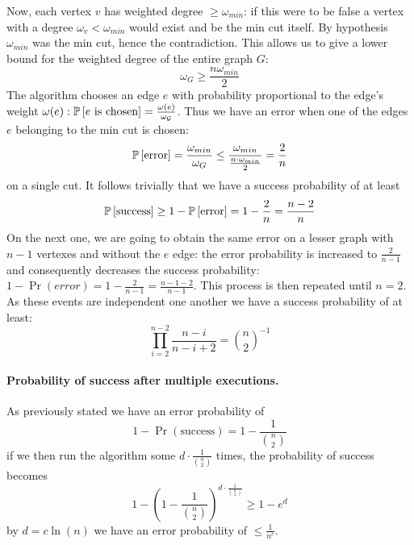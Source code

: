 Now, each vertex $v$ has weighted degree $\geq \omega_{min}$: if this were to be false a vertex with a degree $\omega_v < \omega_{min}$ would exist and be the min cut itself.
By hypothesis $\omega_{min}$ was the min cut, hence the contradiction.
This allows us to give a lower bound for the weighted degree of the entire graph $G$:
\begin{equation*}
\omega_G \geq \frac{n\omega_{min}}{2}
\end{equation*}
The algorithm chooses an edge $e$ with probability proportional to the edge's weight $\omega(e): \operatorname*{\mathbb{P}}\left[{e \text{ is chosen}}\right] = \frac{\omega(e)}{\mathcal{\omega_G}}$.
Thus we have an error when one of the edges $e$ belonging to the min cut is chosen:
\begin{equation*}
\operatorname*{\mathbb{P}}\left[{\text{error}}\right] = \frac{\omega_{min}}{\omega_G} \leq \frac{\omega_{min}}{\frac{n \cdot \omega_{min}}{2}} = \frac{2}{n}
\end{equation*}
on a single cut.
It follows trivially that we have a success probability of at least
\begin{equation*}
\operatorname*{\mathbb{P}}\left[{\text{success}}\right] \geq 1 - \operatorname*{\mathbb{P}}\left[{\text{error}}\right] = 1 - \frac{2}{n} = \frac{n - 2}{n}
\end{equation*}
On the next one, we are going to obtain the same error on a lesser graph with $n - 1$ vertexes and without the $e$ edge: the error probability is increased to $\frac{2}{n - 1}$ and consequently decreases the success probability: $1 - \Pr(error) = 1 - \frac{2}{n - 1} = \frac{n - 1 - 2}{n - 1}$.
This process is then repeated until $n = 2$.
As these events are independent one another we have a success probability of at least:
\begin{equation*}
\prod_{i = 2}^{n - 2} \frac{n - i}{n - i + 2} = {{n}\choose{2}}^{-1}
\end{equation*}

\paragraph{Probability of success after multiple executions.}
As previously stated we have an error probability of
\begin{equation*}
1 - \Pr({\text{success}}) = 1 - \frac{1}{{{n} \choose {2}}}
\end{equation*}
if we then run the algorithm some $d \cdot \frac{1}{{{n} \choose {2}}}$ times, the probability of success becomes
\begin{equation*}
1 - \left(1 - \frac{1}{{{n} \choose {2}}} \right)^{d \cdot \frac{1}{{{n} \choose {2}}}} \geq 1 - e^{d}
\end{equation*}
by $d = c \ln(n)$ we have an error probability of $\leq \frac{1}{n^c}$.